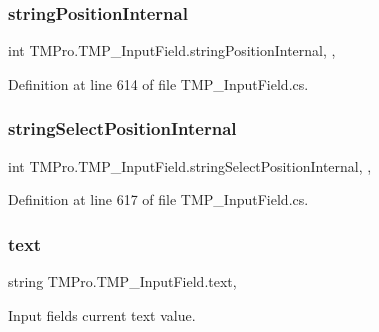 \subsubsection{\texorpdfstring{stringPositionInternal}{stringPositionInternal}}
{\footnotesize\ttfamily int T\+M\+Pro.\+T\+M\+P\+\_\+\+Input\+Field.\+string\+Position\+Internal\hspace{0.3cm}{\ttfamily [get]}, {\ttfamily [set]}, {\ttfamily [protected]}}



Definition at line 614 of file T\+M\+P\+\_\+\+Input\+Field.\+cs.

\mbox{\label{class_t_m_pro_1_1_t_m_p___input_field_a70a7a69109043b8b87e3169cd2347501}} 
\subsubsection{\texorpdfstring{stringSelectPositionInternal}{stringSelectPositionInternal}}
{\footnotesize\ttfamily int T\+M\+Pro.\+T\+M\+P\+\_\+\+Input\+Field.\+string\+Select\+Position\+Internal\hspace{0.3cm}{\ttfamily [get]}, {\ttfamily [set]}, {\ttfamily [protected]}}



Definition at line 617 of file T\+M\+P\+\_\+\+Input\+Field.\+cs.

\mbox{\label{class_t_m_pro_1_1_t_m_p___input_field_ab89ad02ff00c4c076c5bd3303528e5de}} 
\subsubsection{\texorpdfstring{text}{text}}
{\footnotesize\ttfamily string T\+M\+Pro.\+T\+M\+P\+\_\+\+Input\+Field.\+text\hspace{0.3cm}{\ttfamily [get]}, {\ttfamily [set]}}



Input field\textquotesingle{}s current text value. 



